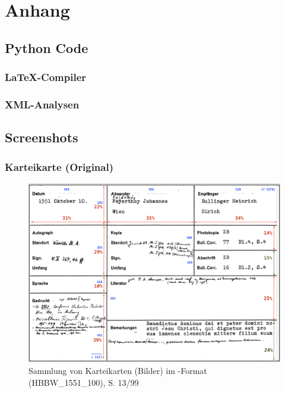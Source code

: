 
\appendix
\section{Anhang}




\subsection{Python Code}


\subsubsection{\LaTeX{}-Compiler}

\begin{spacing}{1}

\end{spacing}


\subsubsection{XML-Analysen}
\label{code:xml_analysen}
\begin{spacing}{1}

\end{spacing}




\subsection{Screenshots}


\subsubsection{Karteikarte (Original)}

\begin{figure}[H]
\centering
\includegraphics[scale=0.42]{Bilder/Karteikarte_Beispiel.png}
\caption{Sammlung von Karteikarten (Bilder) im -Format (HBBW\_1551\_100), S. 13/99}
\end{figure}


